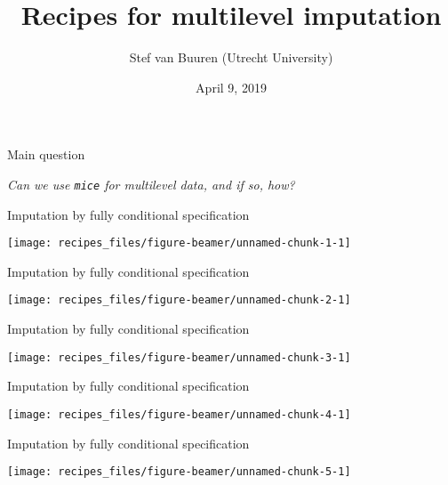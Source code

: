 \documentclass[ignorenonframetext,aspectratio=43]{beamer}
\title{Recipes for multilevel imputation}
\author{Stef van Buuren (Utrecht University)}
\date{April 9, 2019}
\begin{document}
\frame{\titlepage}

\begin{frame}[fragile]{Main question}

\emph{Can we use \texttt{mice} for multilevel data, and if so, how?}

\end{frame}

\begin{frame}{Imputation by fully conditional specification}

\begin{center}\texttt{[image: recipes\_files/figure-beamer/unnamed-chunk-1-1]} \end{center}

\end{frame}

\begin{frame}{Imputation by fully conditional specification}

\begin{center}\texttt{[image: recipes\_files/figure-beamer/unnamed-chunk-2-1]} \end{center}

\end{frame}

\begin{frame}{Imputation by fully conditional specification}

\begin{center}\texttt{[image: recipes\_files/figure-beamer/unnamed-chunk-3-1]} \end{center}

\end{frame}

\begin{frame}{Imputation by fully conditional specification}

\begin{center}\texttt{[image: recipes\_files/figure-beamer/unnamed-chunk-4-1]} \end{center}

\end{frame}

\begin{frame}{Imputation by fully conditional specification}

\begin{center}\texttt{[image: recipes\_files/figure-beamer/unnamed-chunk-5-1]} \end{center}

\end{frame}
\end{document}
